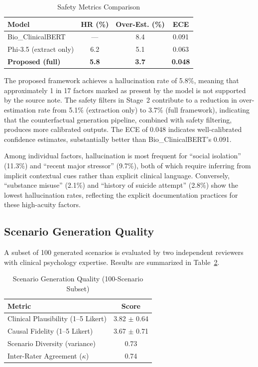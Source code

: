 \documentclass[conference]{IEEEtran}
\begin{document}
\begin{table}[t]
\caption{Safety Metrics Comparison}
\label{tab:safety}
\centering
\begin{tabular}{lccc}
\hline
\textbf{Model} & \textbf{HR (\%)} & \textbf{Over-Est. (\%)} & \textbf{ECE} \\
\hline
Bio\_ClinicalBERT & --- & 8.4 & 0.091 \\
Phi-3.5 (extract only) & 6.2 & 5.1 & 0.063 \\
\textbf{Proposed (full)} & \textbf{5.8} & \textbf{3.7} & \textbf{0.048} \\
\hline
\end{tabular}
\end{table}

The proposed framework achieves a hallucination rate of 5.8\%, meaning that approximately 1 in 17 factors marked as present by the model is not supported by the source note. The safety filters in Stage~2 contribute to a reduction in over-estimation rate from 5.1\% (extraction only) to 3.7\% (full framework), indicating that the counterfactual generation pipeline, combined with safety filtering, produces more calibrated outputs. The ECE of 0.048 indicates well-calibrated confidence estimates, substantially better than Bio\_ClinicalBERT's 0.091.

Among individual factors, hallucination is most frequent for ``social isolation'' (11.3\%) and ``recent major stressor'' (9.7\%), both of which require inferring from implicit contextual cues rather than explicit clinical language. Conversely, ``substance misuse'' (2.1\%) and ``history of suicide attempt'' (2.8\%) show the lowest hallucination rates, reflecting the explicit documentation practices for these high-acuity factors.

\subsection{Scenario Generation Quality}

A subset of 100 generated scenarios is evaluated by two independent reviewers with clinical psychology expertise. Results are summarized in Table~\ref{tab:scenario}.

\begin{table}[t]
\caption{Scenario Generation Quality (100-Scenario Subset)}
\label{tab:scenario}
\centering
\begin{tabular}{lc}
\hline
\textbf{Metric} & \textbf{Score} \\
\hline
Clinical Plausibility (1--5 Likert) & 3.82 $\pm$ 0.64 \\
Causal Fidelity (1--5 Likert) & 3.67 $\pm$ 0.71 \\
Scenario Diversity (variance) & 0.73 \\
Inter-Rater Agreement ($\kappa$) & 0.74 \\
\hline
\end{tabular}
\end{table}
\end{document}
